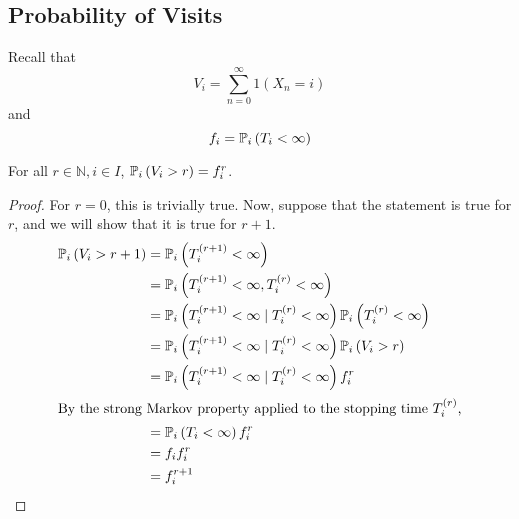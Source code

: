 \subsection{Probability of Visits}
Recall that
\[
	V_i = \sum_{n=0}^\infty 1(X_n = i)
\]
and
\[
	f_i = \mathbb{P}_{i}\left({T_i < \infty}\right)
\]
\begin{lemma}
	For all \( r \in \mathbb N, i \in I \), \( \mathbb{P}_{i}\left({V_i > r}\right) = f_i^r \).
\end{lemma}
\begin{proof}
	For \( r = 0 \), this is trivially true.
	Now, suppose that the statement is true for \( r \), and we will show that it is true for \( r + 1 \).
	\begin{align*}
		\mathbb{P}_{i}\left({V_i > r+1}\right) & = \mathbb{P}_{i}\left({T_i^{(r+1)} < \infty}\right)                                                      \\
		                    & = \mathbb{P}_{i}\left({T_i^{(r+1)} < \infty, T_i^{(r)} < \infty}\right)                                  \\
		                    & = \mathbb{P}_{i}\left({T_i^{(r+1)} < \infty \mid T_i^{(r)} < \infty}\right) \mathbb{P}_{i}\left({T_i^{(r)} < \infty}\right) \\
		                    & = \mathbb{P}_{i}\left({T_i^{(r+1)} < \infty \mid T_i^{(r)} < \infty}\right) \mathbb{P}_{i}\left({V_i > r}\right)            \\
		                    & = \mathbb{P}_{i}\left({T_i^{(r+1)} < \infty \mid T_i^{(r)} < \infty}\right) f_i^r                        \\
		\intertext{By the strong Markov property applied to the stopping time \( T_i^{(r)} \),}
		                    & = \mathbb{P}_{i}\left({T_i < \infty}\right) f_i^r                                                        \\
		                    & = f_i f_i^r                                                                           \\
		                    & = f_i^{r+1}
	\end{align*}
\end{proof}

